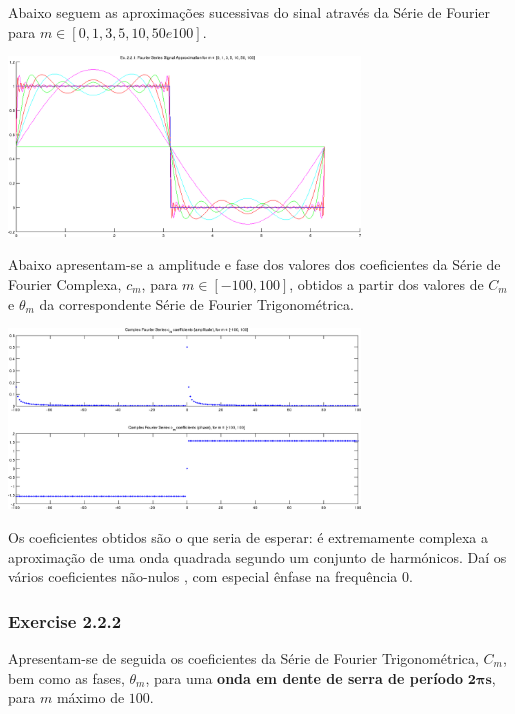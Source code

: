 \documentclass[a4paper]{article}
\begin{document}
\noindent Abaixo seguem as aproximações sucessivas do sinal através da Série de Fourier para $m \in [0, 1, 3, 5, 10, 50 e 100]$.
\begin{center}
	\includegraphics[width=0.70\textwidth]{images/ex2_2_1_approx.png}
	\label{fig:ex2_2_1_approx}
\end{center}

\noindent Abaixo apresentam-se a amplitude e fase dos valores dos coeficientes da Série de Fourier Complexa, $c_m$, para $m \in [-100, 100]$, obtidos a partir dos valores de $C_m$ e $\theta_m$ da correspondente Série de Fourier Trigonométrica.
\begin{center}
	\includegraphics[width=0.70\textwidth]{images/ex2_2_1_complex_cm.png}
	\label{fig:ex2_2_1_complex_cm}
\end{center}

\noindent Os coeficientes obtidos são o que seria de esperar: é extremamente complexa a aproximação de uma onda quadrada segundo um conjunto de harmónicos. Daí os vários coeficientes não-nulos , com especial ênfase na frequência 0.

\subsubsection{Exercise 2.2.2}
\noindent Apresentam-se de seguida os coeficientes da Série de Fourier Trigonométrica, $C_m$, bem como as fases, $\theta_m$, para uma \textbf{onda em dente de serra de período} $\mathbf{2 \pi s}$, para $m$ máximo de $100$.
\end{document}

